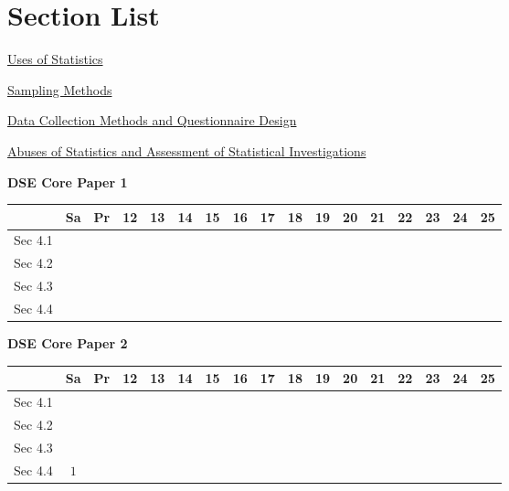 \documentclass[12pt, a4paper]{article}
\begin{document}
\section*{Section List}
\begin{enumx}[label=Sec 4.\arabic*\ ]
\item \hyperref[section:6-4-1]{Uses of Statistics}
\item \hyperref[section:6-4-2]{Sampling Methods}
\item \hyperref[section:6-4-3]{Data Collection Methods and Questionnaire Design}
\item \hyperref[section:6-4-4]{Abuses of Statistics and Assessment of Statistical Investigations}
\end{enumx}
\begin{absolutelynopagebreak}
\begin{center}
\textbf{DSE Core Paper 1}
\end{center}
\begin{center}
\begin{tabular}{|l|c|c|c|c|c|c|c|c|c|c|c|c|c|c|c|c|}
\hline
        & Sa & Pr & 12 & 13 & 14 & 15 & 16 & 17 & 18 & 19 & 20 & 21 & 22 & 23 & 24 & 25 \\\hline\hline
Sec 4.1 &  &  &  &  &  &  &  &  &  &  &  &  &  &  &  &  \\\hline
Sec 4.2 &  &  &  &  &  &  &  &  &  &  &  &  &  &  &  &  \\\hline
Sec 4.3 &  &  &  &  &  &  &  &  &  &  &  &  &  &  &  &  \\\hline
Sec 4.4 &  &  &  &  &  &  &  &  &  &  &  &  &  &  &  &  \\\hline
\end{tabular}
\end{center}
\end{absolutelynopagebreak}
\begin{absolutelynopagebreak}
\begin{center}
\textbf{DSE Core Paper 2}
\end{center}
\begin{center}
\begin{tabular}{|l|c|c|c|c|c|c|c|c|c|c|c|c|c|c|c|c|}
\hline
        & Sa & Pr & 12 & 13 & 14 & 15 & 16 & 17 & 18 & 19 & 20 & 21 & 22 & 23 & 24 & 25 \\\hline\hline
Sec 4.1 &  &  &  &  &  &  &  &  &  &  &  &  &  &  &  &  \\\hline
Sec 4.2 &  &  &  &  &  &  &  &  &  &  &  &  &  &  &  &  \\\hline
Sec 4.3 &  &  &  &  &  &  &  &  &  &  &  &  &  &  &  &  \\\hline
Sec 4.4 &  $1$ &  &  &  &  &  &  &  &  &  &  &  &  &  &  &  \\\hline
\end{tabular}
\end{center}
\end{absolutelynopagebreak}
\end{document}
